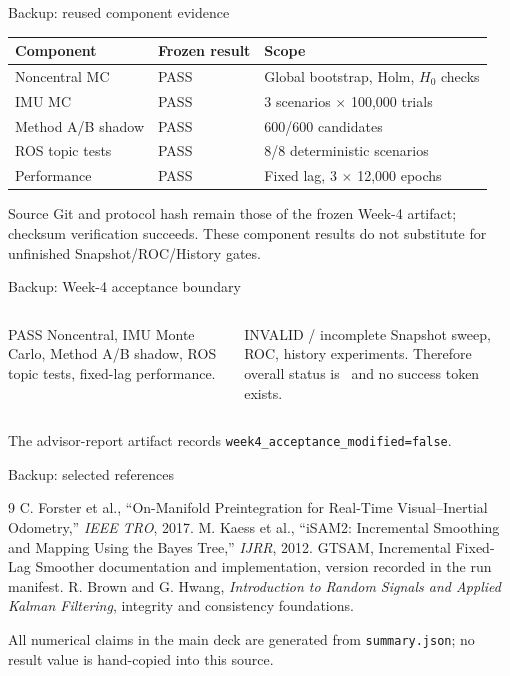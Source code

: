 \documentclass[aspectratio=169,10pt]{beamer}
\begin{document}
\begin{frame}{Backup: reused component evidence}
\small
\begin{tabular}{lll}
\toprule
Component & Frozen result & Scope\\\midrule
Noncentral MC & PASS & Global bootstrap, Holm, $H_0$ checks\\
IMU MC & PASS & 3 scenarios $\times$ 100,000 trials\\
Method A/B shadow & PASS & 600/600 candidates\\
ROS topic tests & PASS & 8/8 deterministic scenarios\\
Performance & PASS & Fixed lag, 3 $\times$ 12,000 epochs\\
\bottomrule
\end{tabular}
\vspace{.8em}
Source Git and protocol hash remain those of the frozen Week-4 artifact; checksum verification succeeds. These component results do not substitute for unfinished Snapshot/ROC/History gates.
\end{frame}

\begin{frame}{Backup: Week-4 acceptance boundary}
\begin{columns}[T]
\begin{block}{PASS}
Noncentral, IMU Monte Carlo, Method A/B shadow, ROS topic tests, fixed-lag performance.
\end{block}
\begin{alertblock}{INVALID / incomplete}
Snapshot sweep, ROC, history experiments. Therefore overall status is \WeekFourStatus\ and no success token exists.
\end{alertblock}
\end{columns}
\vspace{.8em}
The advisor-report artifact records \texttt{week4\_acceptance\_modified=false}.
\end{frame}

\begin{frame}{Backup: selected references}
\footnotesize
\begin{thebibliography}{9}
 C. Forster et al., ``On-Manifold Preintegration for Real-Time Visual--Inertial Odometry,'' \emph{IEEE TRO}, 2017.
 M. Kaess et al., ``iSAM2: Incremental Smoothing and Mapping Using the Bayes Tree,'' \emph{IJRR}, 2012.
 GTSAM, Incremental Fixed-Lag Smoother documentation and implementation, version recorded in the run manifest.
 R. Brown and G. Hwang, \emph{Introduction to Random Signals and Applied Kalman Filtering}, integrity and consistency foundations.
\end{thebibliography}
\vspace{.5em}
All numerical claims in the main deck are generated from \texttt{summary.json}; no result value is hand-copied into this source.
\end{frame}
\end{document}
